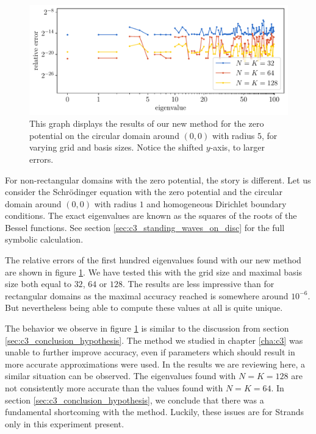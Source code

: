 \begin{figure}
    \begin{center}
        \includegraphics[width=\textwidth]{img/chapter4/nm_test_zero_disc.pdf}
    \end{center}
    \caption{This graph displays the results of our new method for the zero potential on the circular domain around $(0, 0)$ with radius $5$, for varying grid and basis sizes. Notice the shifted $y$-axis, to larger errors.}
    \label{fig:c4_nm_zero_test_disc}
\end{figure}

For non-rectangular domains with the zero potential, the story is different. Let us consider the Schrödinger equation with the zero potential and the circular domain around $(0, 0)$ with radius $1$ and homogeneous Dirichlet boundary conditions. The exact eigenvalues are known as the squares of the roots of the Bessel functions. See section \ref{sec:c3_standing_waves_on_disc} for the full symbolic calculation.

The relative errors of the first hundred eigenvalues found with our new method are shown in figure \ref{fig:c4_nm_zero_test_disc}. We have tested this with the grid size and maximal basis size both equal to $32$, $64$ or $128$. The results are less impressive than for rectangular domains as the maximal accuracy reached is somewhere around $10^{-6}$. But nevertheless being able to compute these values at all is quite unique.

The behavior we observe in figure \ref{fig:c4_nm_zero_test_disc} is similar to the discussion from section \ref{sec:c3_conclusion_hypothesis}. The method we studied in chapter \ref{cha:c3} was unable to further improve accuracy, even if parameters which should result in more accurate approximations were used. In the results we are reviewing here, a similar situation can be observed. The eigenvalues found with $N=K=128$ are not consistently more accurate than the values found with $N=K=64$. In section \ref{sec:c3_conclusion_hypothesis}, we conclude that there was a fundamental shortcoming with the method. Luckily, these issues are for Strands only in this experiment present. 

